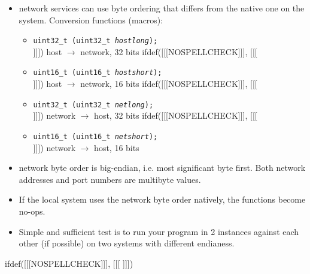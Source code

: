 \begin{slide}
\begin{itemize}
\item network services can use byte ordering that differs from the native
one on the system. Conversion functions (macros):
    \begin{itemize}
    ifdef([[[NOSPELLCHECK]]], [[[
    \item\texttt{uint32\_t (uint32\_t \emph{hostlong});}\\
    ]]]) host $\rightarrow$ network, 32 bits
    ifdef([[[NOSPELLCHECK]]], [[[
    \item\texttt{uint16\_t (uint16\_t \emph{hostshort});}\\
    ]]]) host $\rightarrow$ network, 16 bits
    ifdef([[[NOSPELLCHECK]]], [[[
    \item \texttt{uint32\_t (uint32\_t \emph{netlong});}\\
    ]]]) network $\rightarrow$ host, 32 bits
    ifdef([[[NOSPELLCHECK]]], [[[
    \item \texttt{uint16\_t (uint16\_t \emph{netshort});}\\
    ]]]) network $\rightarrow$ host, 16 bits 
    \end{itemize}
\item network byte order is big-endian, i.e. most significant byte first.
Both network addresses and port numbers are multibyte values.
\end{itemize}
\end{slide}


\begin{itemize}
\item If the local system uses the network byte order natively, the functions
become no-ops.
\item Simple and sufficient test is to run your program in 2 instances 
against each other (if possible) on two systems with different endianess.
\end{itemize}


ifdef([[[NOSPELLCHECK]]], [[[
]]])

